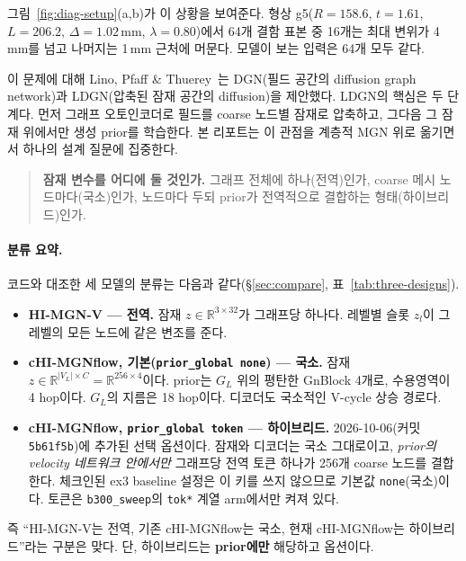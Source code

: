 \documentclass[11pt]{article}
\newcommand{\R}{\mathbb{R}}
\newcommand{\code}[1]{\texttt{#1}}
\begin{document}
그림~\ref{fig:diag-setup}(a,b)가 이 상황을 보여준다. 형상 g5($R=158.6$,
$t=1.61$, $L=206.2$, $\Delta=1.02$\,mm, $\lambda=0.80$)에서 64개 결함 표본 중
16개는 최대 변위가 4\,mm를 넘고 나머지는 1\,mm 근처에 머문다. 모델이 보는
입력은 64개 모두 같다.

이 문제에 대해 Lino, Pfaff \& Thuerey~\cite{lino2025}는 DGN(필드 공간의
diffusion graph network)과 LDGN(압축된 잠재 공간의 diffusion)을 제안했다.
LDGN의 핵심은 두 단계다. 먼저 그래프 오토인코더로 필드를 coarse 노드별
잠재로 압축하고, 그다음 그 잠재 위에서만 생성 prior를 학습한다. 본
리포트는 이 관점을 계층적 MGN 위로 옮기면서 하나의 설계 질문에 집중한다.

\begin{quote}
\textbf{잠재 변수를 어디에 둘 것인가.} 그래프 전체에 하나(전역)인가,
coarse 메시 노드마다(국소)인가, 노드마다 두되 prior가 전역적으로 결합하는
형태(하이브리드)인가.
\end{quote}

\paragraph{분류 요약.} 코드와 대조한 세 모델의 분류는 다음과 같다(\S\ref{sec:compare}, 표~\ref{tab:three-designs}).
\begin{itemize}
\item \textbf{HI-MGN-V --- 전역.} 잠재 $z\in\R^{3\times32}$가 그래프당
  하나다. 레벨별 슬롯 $z_l$이 그 레벨의 모든 노드에 같은 변조를 준다.
\item \textbf{cHI-MGNflow, 기본(\code{prior\_global none}) --- 국소.} 잠재
  $z\in\R^{|V_L|\times C}=\R^{256\times4}$이다. prior는 $G_L$ 위의 평탄한
  GnBlock 4개로, 수용영역이 4 hop이다. $G_L$의 지름은 18 hop이다. 디코더도
  국소적인 V-cycle 상승 경로다.
\item \textbf{cHI-MGNflow, \code{prior\_global token} --- 하이브리드.}
  2026-10-06(커밋 \code{5b61f5b})에 추가된 선택 옵션이다. 잠재와 디코더는
  국소 그대로이고, \emph{prior의 velocity 네트워크 안에서만} 그래프당 전역
  토큰 하나가 256개 coarse 노드를 결합한다. 체크인된 ex3 baseline 설정은 이
  키를 쓰지 않으므로 기본값 \code{none}(국소)이다. 토큰은
  \code{b300\_sweep}의 \code{tok*} 계열 arm에서만 켜져 있다.
\end{itemize}
즉 ``HI-MGN-V는 전역, 기존 cHI-MGNflow는 국소, 현재 cHI-MGNflow는
하이브리드''라는 구분은 맞다. 단, 하이브리드는 \textbf{prior에만} 해당하고
옵션이다.
\end{document}
